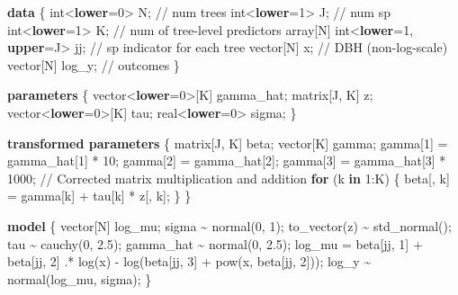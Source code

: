 \documentclass[
  12pt,
  letterpaper,
  DIV=11,
  numbers=noendperiod]{scrartcl}
\newenvironment{Shaded}{\begin{snugshade}}{\end{snugshade}}
\newcommand{\CommentTok}[1]{\textcolor[rgb]{0.37,0.37,0.37}{#1}}
\newcommand{\ControlFlowTok}[1]{\textcolor[rgb]{0.00,0.23,0.31}{\textbf{#1}}}
\newcommand{\DataTypeTok}[1]{\textcolor[rgb]{0.68,0.00,0.00}{#1}}
\newcommand{\DecValTok}[1]{\textcolor[rgb]{0.68,0.00,0.00}{#1}}
\newcommand{\FloatTok}[1]{\textcolor[rgb]{0.68,0.00,0.00}{#1}}
\newcommand{\KeywordTok}[1]{\textcolor[rgb]{0.00,0.23,0.31}{\textbf{#1}}}
\newcommand{\NormalTok}[1]{\textcolor[rgb]{0.00,0.23,0.31}{#1}}
\begin{document}
\begin{Shaded}
\begin{Highlighting}[]
\KeywordTok{data}\NormalTok{ \{}
  \DataTypeTok{int}\NormalTok{\textless{}}\KeywordTok{lower}\NormalTok{=}\DecValTok{0}\NormalTok{\textgreater{} N;                    }\CommentTok{// num trees}
  \DataTypeTok{int}\NormalTok{\textless{}}\KeywordTok{lower}\NormalTok{=}\DecValTok{1}\NormalTok{\textgreater{} J;                    }\CommentTok{// num sp}
  \DataTypeTok{int}\NormalTok{\textless{}}\KeywordTok{lower}\NormalTok{=}\DecValTok{1}\NormalTok{\textgreater{} K;                    }\CommentTok{// num of tree{-}level predictors}
  \DataTypeTok{array}\NormalTok{[N] }\DataTypeTok{int}\NormalTok{\textless{}}\KeywordTok{lower}\NormalTok{=}\DecValTok{1}\NormalTok{, }\KeywordTok{upper}\NormalTok{=J\textgreater{} jj; }\CommentTok{// sp indicator for each tree}
  \DataTypeTok{vector}\NormalTok{[N] x;                       }\CommentTok{// DBH (non{-}log{-}scale)}
  \DataTypeTok{vector}\NormalTok{[N] log\_y;                   }\CommentTok{// outcomes}
\NormalTok{\}}

\KeywordTok{parameters}\NormalTok{ \{}
  \DataTypeTok{vector}\NormalTok{\textless{}}\KeywordTok{lower}\NormalTok{=}\DecValTok{0}\NormalTok{\textgreater{}[K] gamma\_hat;}
  \DataTypeTok{matrix}\NormalTok{[J, K] z;}
  \DataTypeTok{vector}\NormalTok{\textless{}}\KeywordTok{lower}\NormalTok{=}\DecValTok{0}\NormalTok{\textgreater{}[K] tau;}
  \DataTypeTok{real}\NormalTok{\textless{}}\KeywordTok{lower}\NormalTok{=}\DecValTok{0}\NormalTok{\textgreater{} sigma;}
\NormalTok{\}}

\KeywordTok{transformed parameters}\NormalTok{ \{}
  \DataTypeTok{matrix}\NormalTok{[J, K] beta;}
  \DataTypeTok{vector}\NormalTok{[K] gamma;}
\NormalTok{  gamma[}\DecValTok{1}\NormalTok{] = gamma\_hat[}\DecValTok{1}\NormalTok{] * }\DecValTok{10}\NormalTok{;}
\NormalTok{  gamma[}\DecValTok{2}\NormalTok{] = gamma\_hat[}\DecValTok{2}\NormalTok{];}
\NormalTok{  gamma[}\DecValTok{3}\NormalTok{] = gamma\_hat[}\DecValTok{3}\NormalTok{] * }\DecValTok{1000}\NormalTok{;}
  \CommentTok{// Corrected matrix multiplication and addition}
  \ControlFlowTok{for}\NormalTok{ (k }\ControlFlowTok{in} \DecValTok{1}\NormalTok{:K) \{}
\NormalTok{    beta[, k] =  gamma[k] + tau[k] * z[, k];}
\NormalTok{  \}}
\NormalTok{\}}

\KeywordTok{model}\NormalTok{ \{}
  \DataTypeTok{vector}\NormalTok{[N] log\_mu;}
\NormalTok{  sigma \textasciitilde{} normal(}\DecValTok{0}\NormalTok{, }\DecValTok{1}\NormalTok{);}
\NormalTok{  to\_vector(z) \textasciitilde{} std\_normal();}
\NormalTok{  tau \textasciitilde{} cauchy(}\DecValTok{0}\NormalTok{, }\FloatTok{2.5}\NormalTok{);}
\NormalTok{  gamma\_hat \textasciitilde{} normal(}\DecValTok{0}\NormalTok{, }\FloatTok{2.5}\NormalTok{);}
\NormalTok{  log\_mu = beta[jj, }\DecValTok{1}\NormalTok{] + beta[jj, }\DecValTok{2}\NormalTok{] .* log(x) {-}}
\NormalTok{      log(beta[jj, }\DecValTok{3}\NormalTok{] + pow(x, beta[jj, }\DecValTok{2}\NormalTok{]));}
\NormalTok{  log\_y \textasciitilde{} normal(log\_mu, sigma);}
\NormalTok{\}}


\end{Highlighting}
\end{Shaded}
\end{document}
